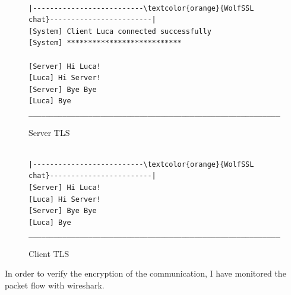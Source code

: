 \documentclass[a4paper,12pt]{article}
\begin{document}
\begin{figure}[H]
\begin{Verbatim}[commandchars=\\\{\}]

|--------------------------\textcolor{orange}{WolfSSL chat}------------------------|
[System] Client Luca connected successfully                           
[System] ***************************                                        
 	 	                                                                                       
[Server] Hi Luca!                                                                       
[Luca] Hi Server!                                                                       
[Server] Bye Bye                                                                       
[Luca] Bye                                                                                 
______________________________________________________________|
\end{Verbatim}
\caption{Server TLS}
\end{figure}
\begin{figure}[H]
\begin{Verbatim}[commandchars=\\\{\}]

|--------------------------\textcolor{orange}{WolfSSL chat}------------------------|                                    	 	                                                                                       
[Server] Hi Luca!                                                                       
[Luca] Hi Server!                                                                       
[Server] Bye Bye                                                                       
[Luca] Bye                                                                                 
______________________________________________________________|
\end{Verbatim}
\caption{Client TLS}
\end{figure}

In order to verify the encryption of the communication, I have monitored the packet flow with wireshark.
\end{document}
